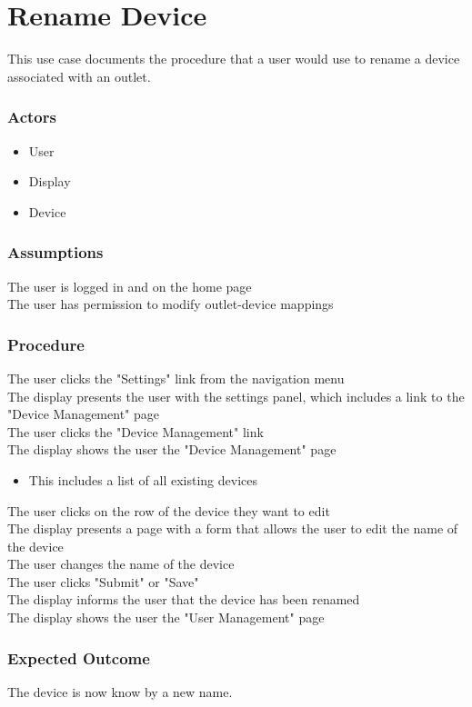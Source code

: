 \section{Rename Device}

This use case documents the procedure that a user would use to rename a device associated with an outlet.

\subsubsection{Actors}
\begin{itemize}
	\item User
	\item Display
	\item Device
\end{itemize}

\subsubsection{Assumptions}

The user is logged in and on the home page\\
The user has permission to modify outlet-device mappings 

\subsubsection{Procedure}

The user clicks the "Settings" link from the navigation menu\\
The display presents the user with the settings panel, which includes a link to the "Device Management" page\\
The user clicks the "Device Management" link\\
The display shows the user the "Device Management" page
\begin{itemize}
	\item This includes a list of all existing devices 
\end{itemize}
The user clicks on the row of the device they want to edit\\
The display presents a page with a form that allows the user to edit the name of the device\\
The user changes the name of the device\\
The user clicks "Submit" or "Save" \\
The display informs the user that the device has been renamed\\
The display shows the user the "User Management" page

\subsubsection{Expected Outcome}

The device is now know by a new name.